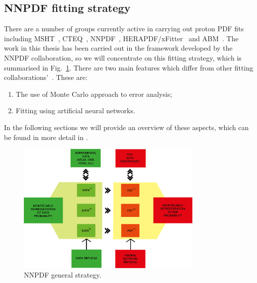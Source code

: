 \subsection{NNPDF fitting strategy}

There are a number of groups currently active in carrying out proton PDF fits including MSHT~\cite{Bailey:2020ooq}, CTEQ~\cite{Hou:2019efy}, NNPDF~\cite{nnpdf}, HERAPDF/xFitter~\cite{CooperSarkar:2011aa} and ABM~\cite{Alekhin:2019ntu}. The work in this thesis has been carried out in the framework developed by the NNPDF collaboration, so we will concentrate on this fitting strategy, which is summarised in Fig.~\ref{fig:generalstrategy}. There are two main features which differ from other fitting collaborations'~\cite{Forte:2002fg}. These are:
\begin{enumerate}
\item  The use of Monte Carlo approach to error analysis;
    \item  Fitting using artificial neural networks.
\end{enumerate}

In the following sections we will provide an overview of these aspects, which can be found in more detail in \cite{Ball:2010de, Ball:2012cx, Ball:2017nwa}.

\begin{figure}[H]
\centering
\includegraphics[width=0.8\textwidth]{background/generalstrategy.png}
\caption{NNPDF general strategy.}
\label{fig:generalstrategy}
\end{figure}

